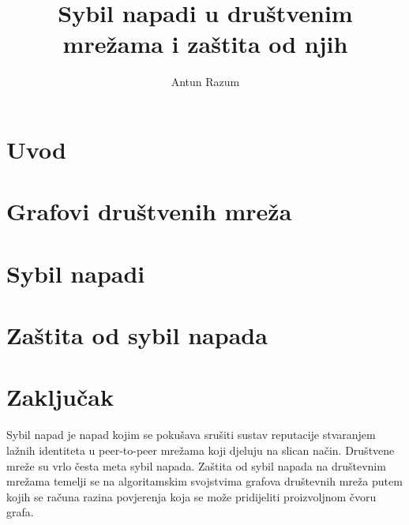 \documentclass[times, utf8, seminar]{fer}
\begin{document}
\title{Sybil napadi u društvenim mrežama i zaštita od njih}
\author{Antun Razum}

\maketitle

\tableofcontents

\chapter{Uvod}

\chapter{Grafovi društvenih mreža}

\chapter{Sybil napadi}

\chapter{Zaštita od sybil napada}

\chapter{Zaključak}




\begin{sazetak}
  Sybil napad je napad kojim se pokušava srušiti sustav reputacije stvaranjem lažnih identiteta u peer-to-peer mrežama koji djeluju na slican način. Društvene mreže su vrlo česta meta sybil napada. Zaštita od sybil napada na društevnim mrežama temelji se na algoritamskim svojstvima grafova društevnih mreža putem kojih se računa razina povjerenja koja se može pridijeliti proizvoljnom čvoru grafa.

\end{sazetak}
\end{document}

